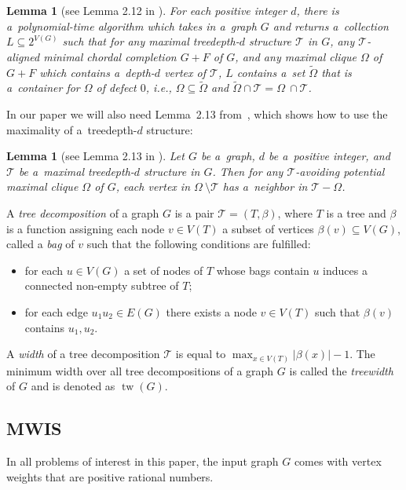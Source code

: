 \documentclass[11pt,a4paper]{article}
\DeclareMathOperator{\tw}{tw}
\newtheorem{lemma}[theorem]{Lemma}
\theoremstyle{definition}
\def\T{\mathcal{T}}
\newcommand{\prz}[2][]{\todo[color=olive!80,#1]{{\textbf{prz:} #2}}}
\begin{document}
\begin{lemma}[see Lemma 2.12 in \cite{DBLP:conf/soda/ChudnovskyMPPR24}]\label{lem:PMCs_with_deep_vertices}
For each positive integer $d$, there is a~polynomial-time algorithm which takes in
a~graph $G$ and returns a~collection $L \subseteq 2^{V(G)}$ such that for any maximal treedepth-$d$ structure $\T$ in $G$, any $\T$-aligned minimal chordal completion $G + F$ of $G$, and any maximal clique $\Omega$ of $G + F$ which contains a~depth-$d$ vertex of $\T$, $L$  contains a~set $\widetilde{\Omega}$ that is a~container for $\Omega$ of defect $0$, i.e., $\Omega\subseteq \widetilde{\Omega}$ and $\widetilde{\Omega} \cap \T = \Omega~\cap \T$.
\end{lemma}

In our paper we will also need Lemma~2.13 from~\cite{DBLP:conf/soda/ChudnovskyMPPR24}, which shows how to use the maximality of a~treedepth-$d$ structure:
\begin{lemma}[see Lemma 2.13 in \cite{DBLP:conf/soda/ChudnovskyMPPR24}]\label{lem:maximality_of_tdstructure}
    Let $G$ be a~graph, $d$ be a~positive integer, and $\T$ be a~maximal treedepth-$d$ structure in $G$. Then for any $\T$-avoiding potential maximal clique $\Omega$ of $G$, each vertex in $\Omega~\setminus  \T$ has a~neighbor in $\T - \Omega$.
\end{lemma}

A {\it tree decomposition} of a graph $G$ is a pair $\T=(T,\beta)$, where $T$ is a tree and $\beta$ is a function assigning each node $v\in V(T)$ a subset of vertices $\beta(v)\subseteq V(G)$, called a {\it bag} of $v$ such that the following conditions are fulfilled:
\begin{itemize}
    \item for each $u\in V(G)$ a set of nodes of $T$ whose bags contain $u$  induces a connected non-empty subtree of $T$;
    \item for each edge $u_1u_2\in E(G)$ there exists a node $v\in V(T)$ such that $\beta(v)$ contains $u_1, u_2$.
\end{itemize}
A {\it width} of a tree decomposition $\T$ is equal to $\max_{x\in V(T)}|\beta(x)|-1$. The minimum width over all tree decompositions of a graph $G$ is called the \emph{treewidth} of $G$ and is denoted as $\tw(G)$.

\subsection{MWIS}

In all problems of interest in this paper, the input graph $G$ comes with vertex
weights that are positive rational numbers. 
\end{document}

